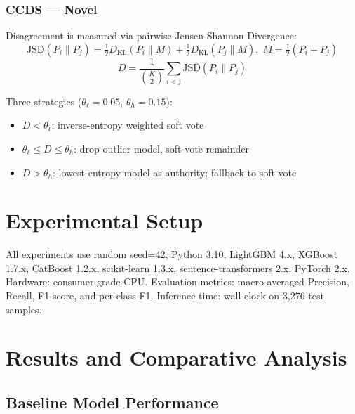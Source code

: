 \documentclass[conference]{IEEEtran}
\begin{document}
\subsubsection{CCDS --- Novel}

Disagreement is measured via pairwise Jensen-Shannon Divergence:
\begin{equation}
  \text{JSD}(P_i\|P_j) = \tfrac{1}{2}D_{\text{KL}}(P_i\|M)
    + \tfrac{1}{2}D_{\text{KL}}(P_j\|M),\; M = \tfrac{1}{2}(P_i{+}P_j)
  \label{eq:jsd}
\end{equation}
\begin{equation}
  D = \frac{1}{\binom{K}{2}}\sum_{i<j}\text{JSD}(P_i\|P_j)
  \label{eq:ccds_D}
\end{equation}

Three strategies ($\theta_\ell{=}0.05$, $\theta_h{=}0.15$):
\begin{itemize}
  \item $D < \theta_\ell$: inverse-entropy weighted soft vote
  \item $\theta_\ell \leq D \leq \theta_h$: drop outlier model, soft-vote remainder
  \item $D > \theta_h$: lowest-entropy model as authority; fallback to soft vote
\end{itemize}

\section{Experimental Setup}
\label{sec:setup}

All experiments use random seed=42, Python 3.10, LightGBM 4.x, XGBoost 1.7.x,
CatBoost 1.2.x, scikit-learn 1.3.x, sentence-transformers 2.x, PyTorch 2.x.
Hardware: consumer-grade CPU. Evaluation metrics: macro-averaged Precision,
Recall, F1-score, and per-class F1. Inference time: wall-clock on 3,276
test samples.

\section{Results and Comparative Analysis}
\label{sec:results}

\subsection{Baseline Model Performance}
\end{document}
